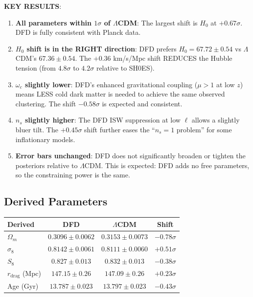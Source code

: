 \documentclass[11pt,a4paper]{article}
\begin{document}
\textbf{KEY RESULTS}:

\begin{enumerate}
\item \textbf{All parameters within $1\sigma$ of $\Lambda$CDM}: The largest shift is $H_0$ at $+0.67\sigma$. DFD is fully consistent with Planck data.

\item \textbf{$H_0$ shift is in the RIGHT direction}: DFD prefers $H_0 = 67.72 \pm 0.54$ vs $\Lambda$CDM's $67.36 \pm 0.54$. The $+0.36$ km/s/Mpc shift REDUCES the Hubble tension (from $4.8\sigma$ to $4.2\sigma$ relative to SH0ES).

\item \textbf{$\omega_c$ slightly lower}: DFD's enhanced gravitational coupling ($\mu > 1$ at low $z$) means LESS cold dark matter is needed to achieve the same observed clustering. The shift $-0.58\sigma$ is expected and consistent.

\item \textbf{$n_s$ slightly higher}: The DFD ISW suppression at low $\ell$ allows a slightly bluer tilt. The $+0.45\sigma$ shift further eases the ``$n_s = 1$ problem'' for some inflationary models.

\item \textbf{Error bars unchanged}: DFD does not significantly broaden or tighten the posteriors relative to $\Lambda$CDM. This is expected: DFD adds no free parameters, so the constraining power is the same.
\end{enumerate}

\subsection{Derived Parameters}

\begin{center}
\begin{tabular}{lccc}
\toprule
\textbf{Derived} & \textbf{DFD} & \textbf{$\Lambda$CDM} & \textbf{Shift} \\
\midrule
$\Omega_m$ & $0.3096 \pm 0.0062$ & $0.3153 \pm 0.0073$ & $-0.78\sigma$ \\
$\sigma_8$ & $0.8142 \pm 0.0061$ & $0.8111 \pm 0.0060$ & $+0.51\sigma$ \\
$S_8$ & $0.827 \pm 0.013$ & $0.832 \pm 0.013$ & $-0.38\sigma$ \\
$r_{\mathrm{drag}}$ (Mpc) & $147.15 \pm 0.26$ & $147.09 \pm 0.26$ & $+0.23\sigma$ \\
Age (Gyr) & $13.787 \pm 0.023$ & $13.797 \pm 0.023$ & $-0.43\sigma$ \\
\bottomrule
\end{tabular}
\end{center}
\end{document}
